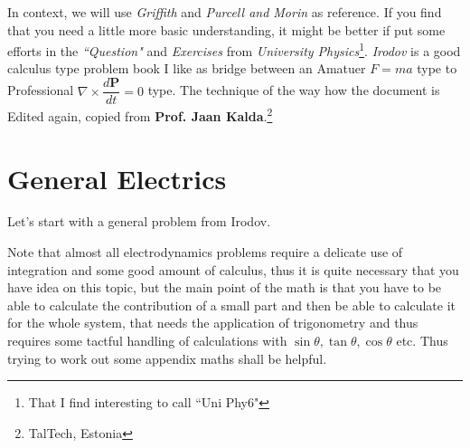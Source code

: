 \documentclass[11pt,a4paper,twocolumn]{article}
\renewcommand{\vec}[1]{\boldsymbol{#1}}
\theoremstyle{definition}
\theoremstyle{definition}
\theoremstyle{definition}
\theoremstyle{definition}
\begin{document}
In context, we will use \emph{Griffith} and \emph{Purcell and Morin} as reference. If you find that you need a little more basic understanding, it might be better if put some efforts in the \emph{``Question"} and \emph{Exercises} from \emph{University Physics}\footnote{That I find interesting to call ``Uni Phy6"}. \emph{Irodov} is a good calculus type problem book I like as bridge between an Amatuer $F=ma$ type to Professional $ \nabla \times \dfrac{d\vec{P}}{dt} = 0$ type. The technique of the way how the document is Edited again, copied from \textbf{Prof. Jaan Kalda}.\footnote{TalTech, Estonia}
\section{\small{General Electrics}}
  
  
Let's start with a general problem from Irodov.

Note that almost all electrodynamics problems require a delicate use of integration and some good amount of calculus, thus it is quite necessary that you have idea on this topic, but the main point of the math is that you have to be able to calculate the contribution of a small part and then be able to calculate it for the whole system, that needs the application of trigonometry and thus requires some tactful handling of calculations with $\sin \theta, \tan \theta, \cos \theta$ etc. Thus trying to work out some appendix maths shall be helpful.
\end{document}
